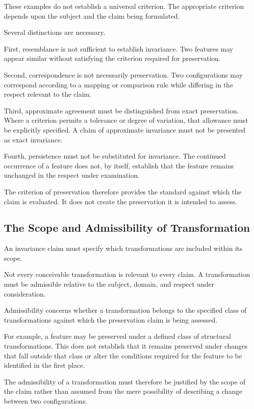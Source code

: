 These examples do not establish a universal
criterion. The appropriate criterion
depends upon the subject and the claim
being formulated.

Several distinctions are necessary.

First, resemblance is not sufficient
to establish invariance. Two features
may appear similar without satisfying
the criterion required for preservation.

Second, correspondence is not necessarily
preservation. Two configurations may
correspond according to a mapping or
comparison rule while differing in
the respect relevant to the claim.

Third, approximate agreement must be
distinguished from exact preservation.
Where a criterion permits a tolerance
or degree of variation, that allowance
must be explicitly specified. A claim
of approximate invariance must not
be presented as exact invariance.

Fourth, persistence must not be substituted
for invariance. The continued occurrence
of a feature does not, by itself, establish
that the feature remains unchanged in
the respect under examination.

The criterion of preservation therefore
provides the standard against which
the claim is evaluated. It does not
create the preservation it is intended
to assess.

\subsection{The Scope and Admissibility of Transformation}

An invariance claim must specify which
transformations are included within
its scope.

Not every conceivable transformation
is relevant to every claim. A transformation
must be admissible relative to the
subject, domain, and respect under
consideration.

Admissibility concerns whether a
transformation belongs to the specified
class of transformations against which
the preservation claim is being assessed.

For example, a feature may be preserved
under a defined class of structural
transformations. This does not establish
that it remains preserved under changes
that fall outside that class or alter
the conditions required for the feature
to be identified in the first place.

The admissibility of a transformation
must therefore be justified by the
scope of the claim rather than assumed
from the mere possibility of describing
a change between two configurations.

